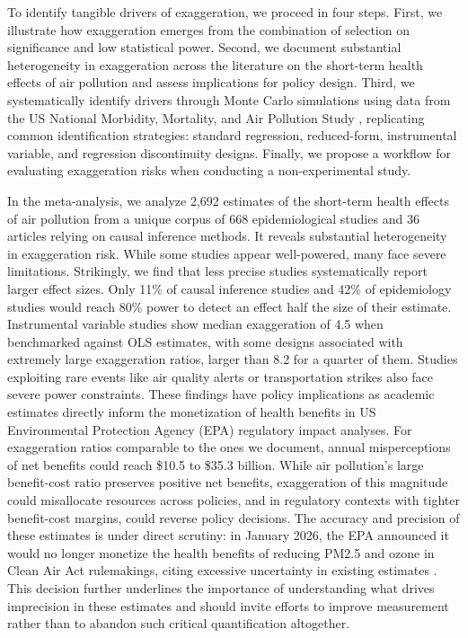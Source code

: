 \documentclass[12pt]{article}
\begin{document}
		 To identify tangible drivers of exaggeration, we proceed in four steps. First, we illustrate how exaggeration emerges from the combination of selection on significance and low statistical power. Second, we document substantial heterogeneity in exaggeration across the literature on the short-term health effects of air pollution and assess implications for policy design. Third, we systematically identify drivers through Monte Carlo simulations using data from the US National Morbidity, Mortality, and Air Pollution Study \citep{samet_national_2000}, replicating common identification strategies: standard regression, reduced-form, instrumental variable, and regression discontinuity designs. Finally, we propose a workflow for evaluating exaggeration risks when conducting a non-experimental study.
		 
		In the meta-analysis, we analyze 2,692 estimates of the short-term health effects of air pollution from a unique corpus of 668 epidemiological studies and 36 articles relying on causal inference methods. It reveals substantial heterogeneity in exaggeration risk. While some studies appear well-powered, many face severe limitations. Strikingly, we find that less precise studies systematically report larger effect sizes. Only 11\% of causal inference studies and 42\% of epidemiology studies would reach 80\% power to detect an effect half the size of their estimate. Instrumental variable studies show median exaggeration of 4.5 when benchmarked against OLS estimates, with some designs associated with extremely large exaggeration ratios, larger than 8.2 for a quarter of them. Studies exploiting rare events like air quality alerts or transportation strikes also face severe power constraints. %
		These findings have policy implications as academic estimates directly inform the monetization of health benefits in US Environmental Protection Agency (EPA) regulatory impact analyses. For exaggeration ratios comparable to the ones we document, annual misperceptions of net benefits could reach \$10.5 to \$35.3 billion. While air pollution's large benefit-cost ratio preserves positive net benefits, exaggeration of this magnitude could misallocate resources across policies, and in regulatory contexts with tighter benefit-cost margins, could reverse policy decisions. The accuracy and precision of these estimates is under direct scrutiny: in January 2026, the EPA announced it would no longer monetize the health benefits of reducing PM2.5 and ozone in Clean Air Act rulemakings, citing excessive uncertainty in existing estimates \citep{u.s.epa_economic_2026}. This decision further underlines the importance of understanding what drives imprecision in these estimates and should invite efforts to improve measurement rather than to abandon such critical quantification altogether.
		
\end{document}
